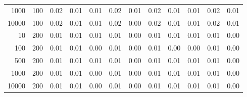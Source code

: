\begin{table}[ht]
\begin{tabular}{rrrrrrrrrrrr}
  1000 & 100 & 0.02 & 0.01 & 0.01 & 0.02 & 0.01 & 0.02 & 0.01 & 0.01 & 0.02 & 0.01 \\ 
  10000 & 100 & 0.02 & 0.01 & 0.01 & 0.02 & 0.00 & 0.02 & 0.01 & 0.01 & 0.02 & 0.01 \\ 
  10 & 200 & 0.01 & 0.01 & 0.01 & 0.01 & 0.00 & 0.01 & 0.01 & 0.01 & 0.01 & 0.00 \\ 
  100 & 200 & 0.01 & 0.01 & 0.00 & 0.01 & 0.00 & 0.01 & 0.00 & 0.00 & 0.01 & 0.00 \\ 
  500 & 200 & 0.01 & 0.01 & 0.01 & 0.01 & 0.00 & 0.01 & 0.01 & 0.01 & 0.01 & 0.00 \\ 
  1000 & 200 & 0.01 & 0.01 & 0.00 & 0.01 & 0.00 & 0.01 & 0.01 & 0.01 & 0.01 & 0.00 \\ 
  10000 & 200 & 0.01 & 0.01 & 0.00 & 0.01 & 0.00 & 0.01 & 0.01 & 0.01 & 0.01 & 0.00 \\ 
   \hline
\end{tabular}
\end{table}
